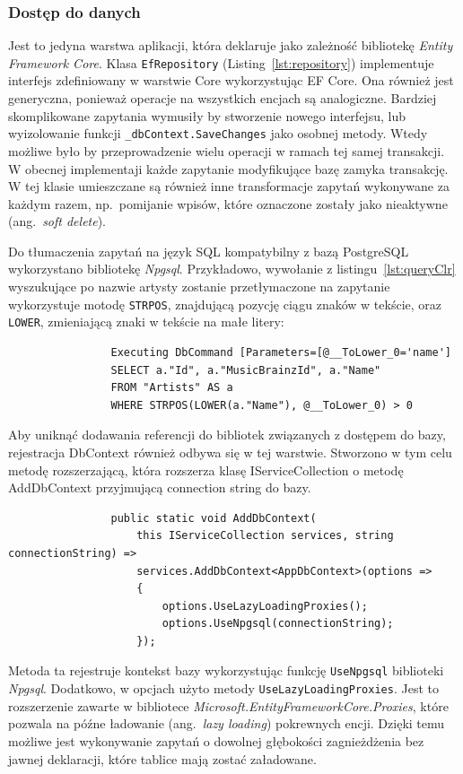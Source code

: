 		\subsubsection*{Dostęp do danych}
			Jest to jedyna warstwa aplikacji, która deklaruje jako zależność bibliotekę \emph{Entity Framework Core}.
			Klasa \verb|EfRepository| (Listing~\ref{lst:repository}) implementuje interfejs zdefiniowany w warstwie Core wykorzystując EF Core.
			Ona również jest generyczna, ponieważ operacje na wszystkich encjach są analogiczne.
			Bardziej skomplikowane zapytania wymusiły by stworzenie nowego interfejsu, lub wyizolowanie funkcji \verb|_dbContext.SaveChanges| jako osobnej metody.
			Wtedy możliwe było by przeprowadzenie wielu operacji w ramach tej samej transakcji.
			W obecnej implementaji każde zapytanie modyfikujące bazę zamyka transakcję.
			W tej klasie umieszczane są również inne transformacje zapytań wykonywane za każdym razem,
			np.\ pomijanie wpisów, które oznaczone zostały jako nieaktywne (ang.\ \emph{soft delete}).
			
			Do tłumaczenia zapytań na język SQL kompatybilny z bazą PostgreSQL wykorzystano bibliotekę \emph{Npgsql}.
			Przykładowo, wywołanie z listingu~\ref{lst:queryClr} wyszukujące po nazwie artysty zostanie przetłymaczone na zapytanie wykorzystuje motodę \verb|STRPOS|,
			znajdującą pozycję ciągu znaków w tekście, oraz \verb|LOWER|, zmieniającą znaki w tekście na małe litery:
			\begin{lstlisting}
				Executing DbCommand [Parameters=[@__ToLower_0='name']
				SELECT a."Id", a."MusicBrainzId", a."Name"
				FROM "Artists" AS a
				WHERE STRPOS(LOWER(a."Name"), @__ToLower_0) > 0
			\end{lstlisting}
			
			Aby uniknąć dodawania referencji do bibliotek związanych z dostępem do bazy, rejestracja DbContext również odbywa się w tej warstwie.
			Stworzono w tym celu metodę rozszerzającą,
			która rozszerza klasę IServiceCollection o metodę AddDbContext przyjmującą connection string do bazy.
			\begin{lstlisting}
				public static void AddDbContext(
					this IServiceCollection services, string connectionString) =>
					services.AddDbContext<AppDbContext>(options =>
					{
						options.UseLazyLoadingProxies();
						options.UseNpgsql(connectionString);
					});
			\end{lstlisting}
			Metoda ta rejestruje kontekst bazy wykorzystując funkcję \verb|UseNpgsql| biblioteki \emph{Npgsql}.
			Dodatkowo, w opcjach użyto metody \verb|UseLazyLoadingProxies|.
			Jest to rozszerzenie zawarte w bibliotece \emph{Microsoft.EntityFrameworkCore.Proxies},
			które pozwala na późne ładowanie (ang.\ \emph{lazy loading}) pokrewnych encji.
			Dzięki temu możliwe jest wykonywanie zapytań o dowolnej głębokości zagnieżdżenia bez jawnej deklaracji, które tablice mają zostać załadowane.
			
